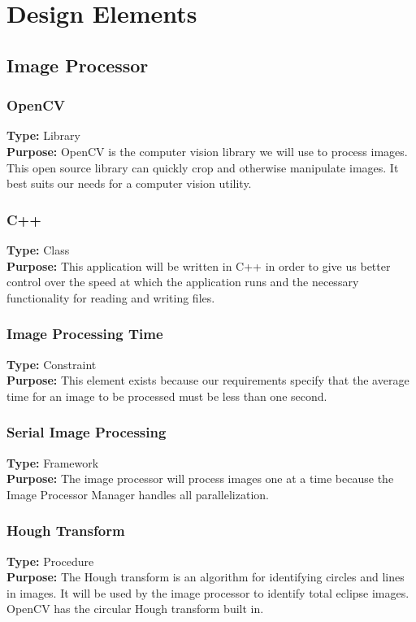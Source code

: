 \documentclass[10pt, onecolumn, draftclsnofoot, letterpaper, compsoc]{IEEEtran}
\begin{document}
\section{Design Elements}

\subsection{Image Processor}

\subsubsection{OpenCV}
\textbf{Type:} Library\\
\textbf{Purpose:} OpenCV is the computer vision library we will use to process
images. This open source library can quickly crop and otherwise manipulate
images. It best suits our needs for a computer vision utility.\\

\subsubsection{C++}
\textbf{Type:} Class\\
\textbf{Purpose:} This application will be written in C++ in order to give us
better control over the speed at which the application runs and the necessary
functionality for reading and writing files. \\

\subsubsection{Image Processing Time}
\textbf{Type:} Constraint\\
\textbf{Purpose:} This element exists because our requirements specify that the
average time for an image to be processed must be less than one second.\\

\subsubsection{Serial Image Processing}
\textbf{Type:} Framework\\
\textbf{Purpose:} The image processor will process images one at a time because
the Image Processor Manager handles all parallelization.\\

\subsubsection{Hough Transform}
\textbf{Type:} Procedure\\
\textbf{Purpose:} The Hough transform is an algorithm for identifying circles
and lines in images. It will be used by the image processor to identify total
eclipse images. OpenCV has the circular Hough transform built in. \\
\end{document}
